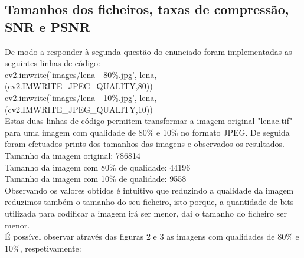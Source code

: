 \documentclass[12pt,a4paper]{article}
\begin{document}
\subsection{Tamanhos dos ficheiros, taxas de compressão, SNR e PSNR}
De modo a responder à segunda questão do enunciado foram implementadas as seguintes linhas de código:\\
\newline
cv2.imwrite('images/lena - 80\%.jpg', lena, (cv2.IMWRITE\_JPEG\_QUALITY,80))\\
cv2.imwrite('images/lena - 10\%.jpg', lena, (cv2.IMWRITE\_JPEG\_QUALITY,10))\\
\newline
Estas duas linhas de código permitem transformar a imagem original "lenac.tif" para uma imagem com qualidade de 80\% e 10\% no formato JPEG. De seguida foram efetuados prints dos tamanhos das imagens e observados os resultados.\\
\newline
\newline
Tamanho da imagem original: 786814\\
Tamanho da imagem com 80\% de qualidade: 44196\\
Tamanho da imagem com 10\% de qualidade: 9558\\
\newline
Observando os valores obtidos é intuitivo que reduzindo a qualidade da imagem reduzimos também o tamanho do seu ficheiro, isto porque, a quantidade de bits utilizada para codificar a imagem irá ser menor, dai o tamanho do ficheiro ser menor.\\
\newline
É possível observar através das figuras 2 e 3 as imagens com qualidades de 80\% e 10\%, respetivamente: 
\end{document}
